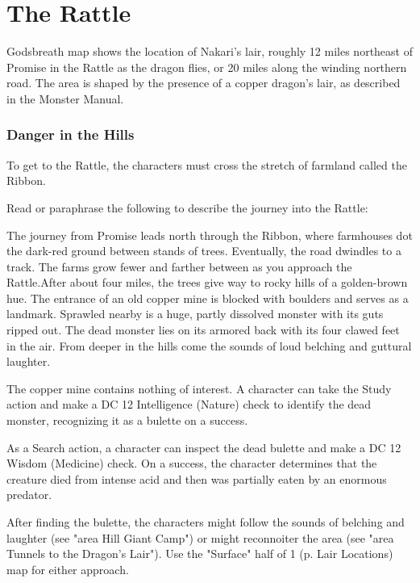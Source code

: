 \documentclass[letterpaper, 11pt, twocolumn]{dndbook}
\begin{document}
\section{The Rattle}



Godsbreath map shows the location of Nakari's lair, roughly 12 miles northeast of Promise in the Rattle as the dragon flies, or 20 miles along the winding northern road. The area is shaped by the presence of a copper dragon's lair, as described in the Monster Manual.

\subsubsection{Danger in the Hills}


To get to the Rattle, the characters must cross the stretch of farmland called the Ribbon.

Read or paraphrase the following to describe the journey into the Rattle:

\begin{DndReadAloud}
The journey from Promise leads north through the Ribbon, where farmhouses dot the dark-red ground between stands of trees. Eventually, the road dwindles to a track. The farms grow fewer and farther between as you approach the Rattle.After about four miles, the trees give way to rocky hills of a golden-brown hue. The entrance of an old copper mine is blocked with boulders and serves as a landmark. Sprawled nearby is a huge, partly dissolved monster with its guts ripped out. The dead monster lies on its armored back with its four clawed feet in the air. From deeper in the hills come the sounds of loud belching and guttural laughter.
\end{DndReadAloud}

The copper mine contains nothing of interest. A character can take the Study action and make a DC 12 Intelligence (Nature) check to identify the dead monster, recognizing it as a bulette on a success.

As a Search action, a character can inspect the dead bulette and make a DC 12 Wisdom (Medicine) check. On a success, the character determines that the creature died from intense acid and then was partially eaten by an enormous predator.

After finding the bulette, the characters might follow the sounds of belching and laughter (see "area Hill Giant Camp") or might reconnoiter the area (see "area Tunnels to the Dragon's Lair"). Use the "Surface" half of 1 (p. Lair Locations) map for either approach.
\end{document}
